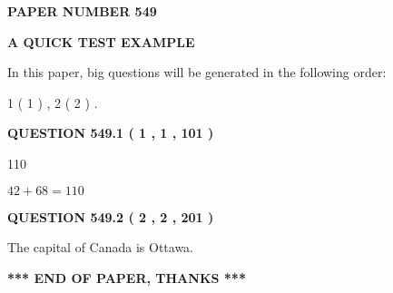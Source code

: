 \documentclass[12pt]{article}
\begin{document}
   
\newpage 
\setcounter{page}{ 
   549001 } 
   
   
   
   
 {\textbf{ \Large{ PAPER NUMBER  549  }}}
   
   
\vspace{0.2in}
   
   
   
   
   
   
 \vspace{0.2in}
{\LARGE {\textbf{ A QUICK TEST EXAMPLE}}}
   
   
   
\vspace{0.2in}
   
In this paper, big questions will be generated in the following order: 
   
   
   1 ( 1 )
 ,
   2 ( 2 )
 .
  
\vspace{0.2in}
  
{\textbf{\Large{QUESTION
549.1 
 ( 1 , 1 , 101 )
}}}
  
  
 
 
\noindent{}

110
 
 
 
 
\noindent{}

$ %
42 +  %
68=   %
110$
 
 
  
\vspace{0.2in}
  
{\textbf{\Large{QUESTION
549.2 
 ( 2 , 2 , 201 )
}}}
  
  
 
 
\noindent{}
 
 
The capital of Canada is Ottawa.
 
 
 
 
   
   
 \vspace{0.2in}
 
   
   
   
   
\vspace{1.0in} 
{\textbf{\large{ *** END OF PAPER, THANKS *** }}} 
   
\end{document}
